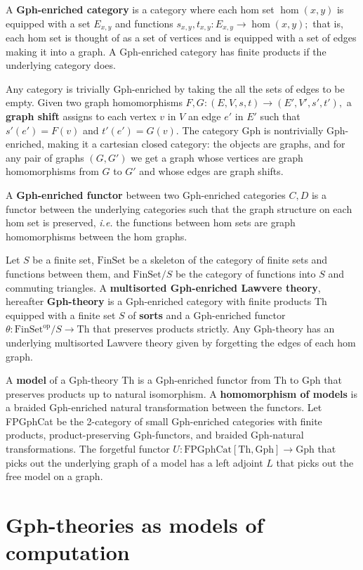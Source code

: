 \documentclass{llncs}
\newcommand{\maps}{\colon}
\newcommand{\Th}{\mathrm{Th}}
\newcommand{\Gph}{\mathrm{Gph}}
\newcommand{\FinSet}{\mathrm{FinSet}}
\newcommand{\FPGphCat}{\mathrm{FPGphCat}}
\newcommand{\op}{\mathrm{op}}
\begin{document}
A {\bf Gph-enriched category} is a category where each hom set $\hom(x,y)$ is equipped with a set $E_{x,y}$ and functions $s_{x,y}, t_{x,y}\maps E_{x,y} \to \hom(x,y);$ that is, each hom set is thought of as a set of vertices and is equipped with a set of edges making it into a graph.  A Gph-enriched category has finite products if the underlying category does.

Any category is trivially Gph-enriched by taking the all the sets of edges to be empty.  Given two graph homomorphisms $F, G\maps (E, V, s, t) \to (E', V', s', t'),$ a {\bf graph shift} assigns to each vertex $v$ in $V$ an edge $e'$ in $E'$ such that $s'(e') = F(v)$ and $t'(e') = G(v).$  The category Gph is nontrivially Gph-enriched, making it a cartesian closed category: the objects are graphs, and for any pair of graphs $(G, G')$ we get a graph whose vertices are graph homomorphisms from $G$ to $G'$ and whose edges are graph shifts.

A {\bf Gph-enriched functor} between two Gph-enriched categories $C, D$ is a functor between the underlying categories such that the graph structure on each hom set is preserved, {\em i.e.} the functions between hom sets are graph homomorphisms between the hom graphs.

Let $S$ be a finite set, $\FinSet$ be a skeleton of the category of finite sets and functions between them, and $\FinSet/S$ be the category of functions into $S$ and commuting triangles.  A {\bf multisorted Gph-enriched Lawvere theory}, hereafter {\bf Gph-theory} is a Gph-enriched category with finite products Th equipped with a finite set $S$ of {\bf sorts} and a Gph-enriched functor $\theta\maps \FinSet^{\op}/S \to \Th$ that preserves products strictly.  Any Gph-theory has an underlying multisorted Lawvere theory given by forgetting the edges of each hom graph.

A {\bf model} of a Gph-theory Th is a Gph-enriched functor from Th to Gph that preserves products up to natural isomorphism.  A {\bf homomorphism of models} is a braided Gph-enriched natural transformation between the functors.  Let FPGphCat be the 2-category of small Gph-enriched categories with finite products, product-preserving Gph-functors, and braided Gph-natural transformations.  The forgetful functor $U\maps \FPGphCat[\Th, \Gph] \to \Gph$ that picks out the underlying graph of a model has a left adjoint $L$ that picks out the free model on a graph.

\section{Gph-theories as models of computation}
\end{document}
